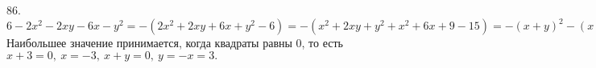 86. $6-2x^2-2xy-6x-y^2=-(2x^2+2xy+6x+y^2-6)=-(x^2+2xy+y^2+x^2+6x+9-15)=-(x+y)^2-(x+3)^2+15.$ Наибольшее значение принимается, когда квадраты равны 0, то есть $x+3=0,\ x=-3,\ x+y=0,\ y=-x=3.$\\
